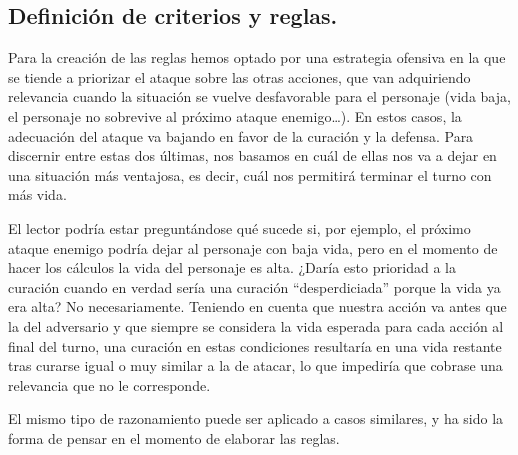 \subsection{Definición de criterios y reglas.}
Para la creación de las reglas hemos optado por una estrategia ofensiva en la que se tiende a priorizar el ataque sobre las otras acciones, que van adquiriendo relevancia cuando la situación se vuelve desfavorable para el personaje (vida baja, el personaje no sobrevive al próximo ataque enemigo…). En estos casos, la adecuación del ataque va bajando en favor de la curación y la defensa. Para discernir entre estas dos últimas, nos basamos en cuál de ellas nos va a dejar en una situación más ventajosa, es decir, cuál nos permitirá terminar el turno con más vida.

El lector podría estar preguntándose qué sucede si, por ejemplo, el próximo ataque enemigo podría dejar al personaje con baja vida, pero en el momento de hacer los cálculos la vida del personaje es alta. ¿Daría esto prioridad a la curación cuando en verdad sería una curación ``desperdiciada'' porque la vida ya era alta? No necesariamente. Teniendo en cuenta que nuestra acción va antes que la del adversario y que siempre se considera la vida esperada para cada acción al final del turno, una curación en estas condiciones resultaría en una vida restante tras curarse igual o muy similar a la de atacar, lo que impediría que cobrase una relevancia que no le corresponde.

El mismo tipo de razonamiento puede ser aplicado a casos similares, y ha sido la forma de pensar en el momento de elaborar las reglas.

